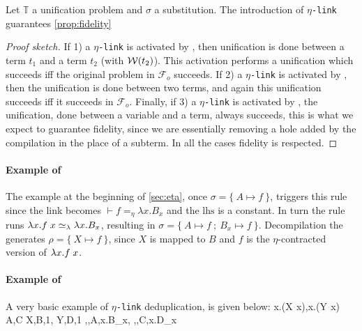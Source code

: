 \documentclass[sigconf,natbib=false,review]{acmart}
\newcommand{\appsep}{\ensuremath{\textcolor{lightgray}{\cdot}}}
\newcommand{\UnifRel}{\ensuremath{\simeq}}
\newcommand{\Ue}{\ensuremath{\UnifRel_\lambda}\xspace}
\newcommand{\linkMacro}[1]{\ensuremath{#1}\texttt{-link}\xspace}
\newcommand{\linketa} {\linkMacro{\eta}}
\newcommand{\Fo}{\ensuremath{\mathcal{F}_{\!o}\xspace}} %
\newcommand{\linketaM}[3]{\ensuremath{#1 \vdash #2 =_\eta #3}}
\newcommand{\lhs}{\ensuremath{\mathrm{lhs}}\xspace}
\newcommand{\hoUnifPb}{\ensuremath{\mathbb{T}}\xspace}
\begin{document}

\begin{lemma}[Fidelity with \linketa]
  Let \hoUnifPb a unification problem and $\sigma$ a substitution. The introduction 
  of \linketa guarantees \cref{prop:fidelity} 
  \label{lemma:fidelity-maybeeta}
\end{lemma}

\begin{proof}[Proof sketch]
  If 1) a \linketa is activated by \progressetaleft, then unification is done
  between a \maybeeta term $t_1$ and a term $t_2$ (with $\mathcal{W}(t_2)$). This
  activation performs a unification which succeeds iff the original problem in
  \Fo{} succeeds. If 2) a \linketa is activated by \progressetadedup, then the
  unification is done between two \maybeeta terms, and again this unification
  succeeds iff it succeeds in \Fo{}. Finally, if 3) a \linketa is activated by
  \progressetaright, the unification, done between a variable and a term,
  always succeeds, this is what we expect to guarantee fidelity, since we
  are essentially removing a hole added by the compilation in the place of a
  \maybeeta subterm. In all the cases fidelity is respected.
\end{proof}

\paragraph{Example of \progressetaleft}

The example at the beginning of \cref{sec:eta}, once
$\sigma = \{~ A \mapsto f ~\}$, triggers this rule since the link
becomes \linketaM{}{f}{\lambda x.B_{x}} and the \lhs is a constant.
In turn the rule runs $\lambda x.f \appsep x \Ue{} \lambda x.B_{x}$,
resulting in $\sigma = \{~ A \mapsto f ~;~ B_{x} \mapsto f ~\}$.
Decompilation the generates $\rho = \{~ X \mapsto f ~\}$, since
$X$ is mapped to $B$ and
$f$ is the $\eta$-contracted version of $\lambda x.f \appsep x$.

\paragraph{Example of \progressetadedup}

A very basic example of \linketa deduplication, is given below:
\printAlll
  {{{\lambda x.(X\appsep x),\lambda x.(Y\appsep x)}}}
  {{{A,C}}}
  {{{X,B,1},
    {Y,D,1}}}
  {{{\eta,,A,\lambda x.B_{x}},
    {\eta,,C,\lambda x.D_{x}}}}
\end{document}
